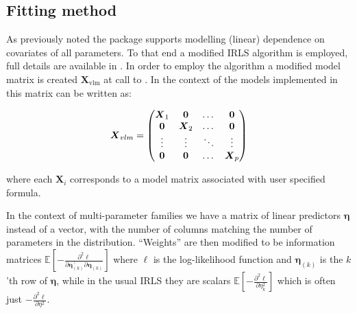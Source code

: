 \documentclass[
]{jss}
\newcommand{\1}{\mathcal{I}} \newcommand{\bZero}{\boldsymbol{0}}
\begin{document}
\subsection{Fitting method}\label{fitting-method}

As previously noted the  package supports modelling
(linear) dependence on covariates of all parameters. To that end a
modified IRLS algorithm is employed, full details are available in
\cite{VGAM-main}. In order to employ the algorithm a modified model
matrix is created \(\boldsymbol{X}_{\text{vlm}}\) at call to
. In the context of the models implemented in
 this matrix can be written as:

\begin{equation}\label{X_vlm-definition}
  \boldsymbol{X}_{vlm}=
  \begin{pmatrix}
    \boldsymbol{X}_{1} & \boldsymbol{0}&\dotso &\boldsymbol{0}\cr
    \boldsymbol{0}& \boldsymbol{X}_{2} &\dotso &\boldsymbol{0}\cr
    \vdots & \vdots & \ddots & \vdots\cr
    \boldsymbol{0}& \boldsymbol{0}&\dotso &\boldsymbol{X}_{p}
  \end{pmatrix}
\end{equation}

where each \(\boldsymbol{X}_{i}\) corresponds to a model matrix
associated with user specified formula.

In the context of multi-parameter families we have a matrix of linear
predictors \(\boldsymbol{\eta}\) instead of a vector, with the number of
columns matching the number of parameters in the distribution.
``Weights'' are then modified to be information matrices
\(\displaystyle\mathbb{E}\left[-\frac{\partial^{2}\ell}{\partial\boldsymbol{\eta}_{(k)}^\top\partial\boldsymbol{\eta}_{(k)}}\right]\)
where \(\ell\) is the log-likelihood function and
\(\boldsymbol{\eta}_{(k)}\) is the \(k\)'th row of
\(\boldsymbol{\eta}\), while in the usual IRLS they are scalars
\(\displaystyle\mathbb{E}\left[-\frac{\partial^{2}\ell}{\partial\eta_{k}^{2}}\right]\)
which is often just
\(\displaystyle-\frac{\partial^{2}\ell}{\partial\eta^{2}}\).
\end{document}
